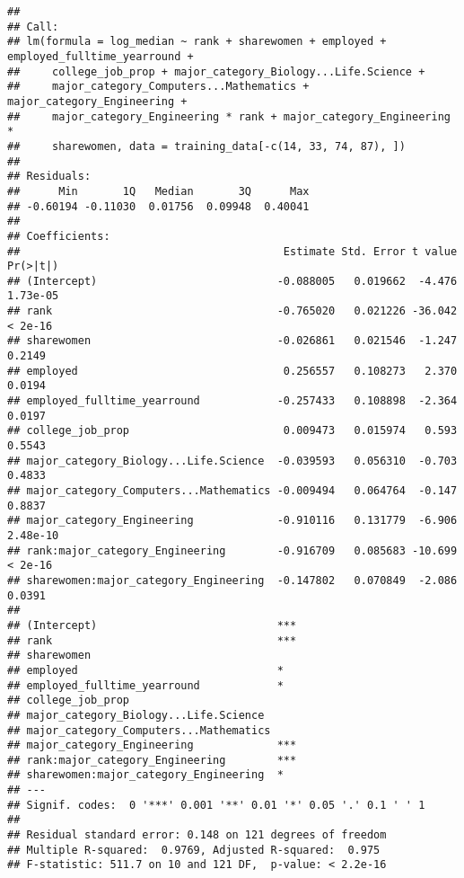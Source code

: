 \documentclass[
]{article}
\begin{document}
\begin{verbatim}
## 
## Call:
## lm(formula = log_median ~ rank + sharewomen + employed + employed_fulltime_yearround + 
##     college_job_prop + major_category_Biology...Life.Science + 
##     major_category_Computers...Mathematics + major_category_Engineering + 
##     major_category_Engineering * rank + major_category_Engineering * 
##     sharewomen, data = training_data[-c(14, 33, 74, 87), ])
## 
## Residuals:
##      Min       1Q   Median       3Q      Max 
## -0.60194 -0.11030  0.01756  0.09948  0.40041 
## 
## Coefficients:
##                                         Estimate Std. Error t value Pr(>|t|)
## (Intercept)                            -0.088005   0.019662  -4.476 1.73e-05
## rank                                   -0.765020   0.021226 -36.042  < 2e-16
## sharewomen                             -0.026861   0.021546  -1.247   0.2149
## employed                                0.256557   0.108273   2.370   0.0194
## employed_fulltime_yearround            -0.257433   0.108898  -2.364   0.0197
## college_job_prop                        0.009473   0.015974   0.593   0.5543
## major_category_Biology...Life.Science  -0.039593   0.056310  -0.703   0.4833
## major_category_Computers...Mathematics -0.009494   0.064764  -0.147   0.8837
## major_category_Engineering             -0.910116   0.131779  -6.906 2.48e-10
## rank:major_category_Engineering        -0.916709   0.085683 -10.699  < 2e-16
## sharewomen:major_category_Engineering  -0.147802   0.070849  -2.086   0.0391
##                                           
## (Intercept)                            ***
## rank                                   ***
## sharewomen                                
## employed                               *  
## employed_fulltime_yearround            *  
## college_job_prop                          
## major_category_Biology...Life.Science     
## major_category_Computers...Mathematics    
## major_category_Engineering             ***
## rank:major_category_Engineering        ***
## sharewomen:major_category_Engineering  *  
## ---
## Signif. codes:  0 '***' 0.001 '**' 0.01 '*' 0.05 '.' 0.1 ' ' 1
## 
## Residual standard error: 0.148 on 121 degrees of freedom
## Multiple R-squared:  0.9769, Adjusted R-squared:  0.975 
## F-statistic: 511.7 on 10 and 121 DF,  p-value: < 2.2e-16
\end{verbatim}
\end{document}
